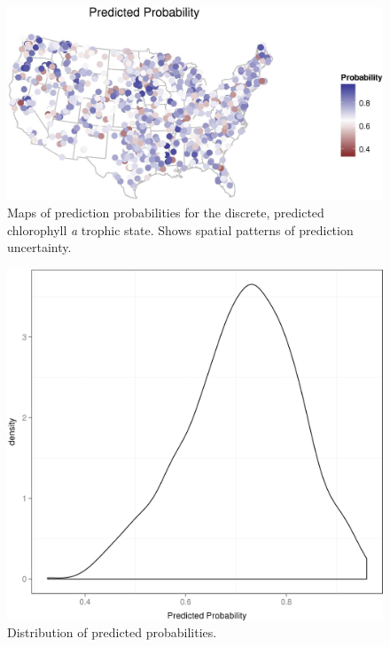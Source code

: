 \documentclass[12pt,]{article}
\begin{document}
\begin{figure}[htbp]
\centering
\includegraphics{manuscript_files/figure-latex/predicted_prob_map-1.jpeg}
\caption{Maps of prediction probabilities for the discrete, predicted
chlorophyll \textit{a} trophic state. Shows spatial patterns of
prediction uncertainty. \label{fig:predicted_prob_map}}
\end{figure}

\newpage

\begin{figure}[htbp]
\centering
\includegraphics{manuscript_files/figure-latex/pred_prob_dist-1.jpeg}
\caption{Distribution of predicted probabilities.
\label{fig:pred_prob_dist}}
\end{figure}

\newpage
\end{document}
